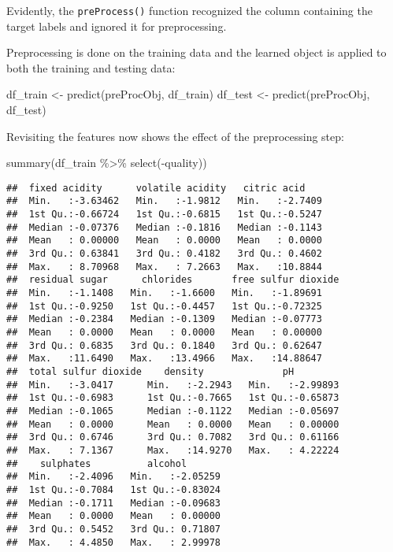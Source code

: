 \documentclass[
]{book}
\newenvironment{Shaded}{\begin{snugshade}}{\end{snugshade}}
\newcommand{\FunctionTok}[1]{\textcolor[rgb]{0.00,0.00,0.00}{#1}}
\newcommand{\NormalTok}[1]{#1}
\newcommand{\OtherTok}[1]{\textcolor[rgb]{0.56,0.35,0.01}{#1}}
\newcommand{\SpecialCharTok}[1]{\textcolor[rgb]{0.00,0.00,0.00}{#1}}
\begin{document}
Evidently, the \texttt{preProcess()} function recognized the column containing the target labels and ignored it for preprocessing.

Preprocessing is done on the training data and the learned object is applied to both the training and testing data:

\begin{Shaded}
\begin{Highlighting}[]
\NormalTok{df\_train }\OtherTok{\textless{}{-}} \FunctionTok{predict}\NormalTok{(preProcObj, df\_train)}
\NormalTok{df\_test }\OtherTok{\textless{}{-}} \FunctionTok{predict}\NormalTok{(preProcObj, df\_test)}
\end{Highlighting}
\end{Shaded}

Revisiting the features now shows the effect of the preprocessing step:

\begin{Shaded}
\begin{Highlighting}[]
\FunctionTok{summary}\NormalTok{(df\_train }\SpecialCharTok{\%\textgreater{}\%} \FunctionTok{select}\NormalTok{(}\SpecialCharTok{{-}}\NormalTok{quality))}
\end{Highlighting}
\end{Shaded}

\begin{verbatim}
##  fixed acidity      volatile acidity   citric acid     
##  Min.   :-3.63462   Min.   :-1.9812   Min.   :-2.7409  
##  1st Qu.:-0.66724   1st Qu.:-0.6815   1st Qu.:-0.5247  
##  Median :-0.07376   Median :-0.1816   Median :-0.1143  
##  Mean   : 0.00000   Mean   : 0.0000   Mean   : 0.0000  
##  3rd Qu.: 0.63841   3rd Qu.: 0.4182   3rd Qu.: 0.4602  
##  Max.   : 8.70968   Max.   : 7.2663   Max.   :10.8844  
##  residual sugar      chlorides       free sulfur dioxide
##  Min.   :-1.1408   Min.   :-1.6600   Min.   :-1.89691   
##  1st Qu.:-0.9250   1st Qu.:-0.4457   1st Qu.:-0.72325   
##  Median :-0.2384   Median :-0.1309   Median :-0.07773   
##  Mean   : 0.0000   Mean   : 0.0000   Mean   : 0.00000   
##  3rd Qu.: 0.6835   3rd Qu.: 0.1840   3rd Qu.: 0.62647   
##  Max.   :11.6490   Max.   :13.4966   Max.   :14.88647   
##  total sulfur dioxide    density              pH          
##  Min.   :-3.0417      Min.   :-2.2943   Min.   :-2.99893  
##  1st Qu.:-0.6983      1st Qu.:-0.7665   1st Qu.:-0.65873  
##  Median :-0.1065      Median :-0.1122   Median :-0.05697  
##  Mean   : 0.0000      Mean   : 0.0000   Mean   : 0.00000  
##  3rd Qu.: 0.6746      3rd Qu.: 0.7082   3rd Qu.: 0.61166  
##  Max.   : 7.1367      Max.   :14.9270   Max.   : 4.22224  
##    sulphates          alcohol        
##  Min.   :-2.4096   Min.   :-2.05259  
##  1st Qu.:-0.7084   1st Qu.:-0.83024  
##  Median :-0.1711   Median :-0.09683  
##  Mean   : 0.0000   Mean   : 0.00000  
##  3rd Qu.: 0.5452   3rd Qu.: 0.71807  
##  Max.   : 4.4850   Max.   : 2.99978
\end{verbatim}
\end{document}
